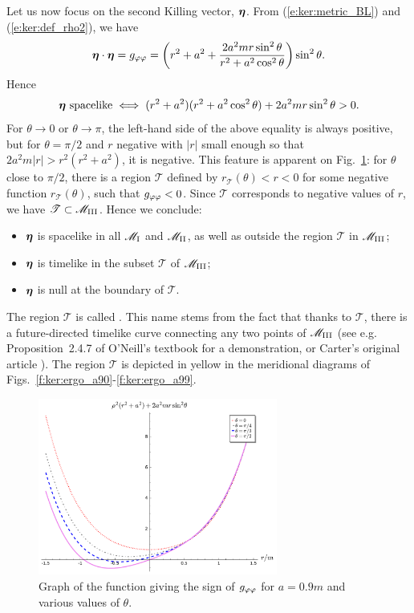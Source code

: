 Let us now focus on the second Killing vector, $\bm{\eta}$.
From (\ref{e:ker:metric_BL}) and (\ref{e:ker:def_rho2}), we have
\[
    \bm{\eta}\cdot\bm{\eta} = g_{\varphi\varphi} = \left( r^2 + a^2 + \frac{2 a^2 m r \sin^2\theta}{r^2 + a^2\cos^2\theta} \right) \sin^2\theta .
\]
Hence
\[
    \bm{\eta}\ \mbox{spacelike} \iff
        (r^2 + a^2)(r^2 + a^2\cos^2\theta) + 2 a^2 m r \sin^2\theta > 0 .
\]
For $\theta\rightarrow 0$ or $\theta\rightarrow\pi$, the left-hand side of the above equality
is always positive, but for $\theta=\pi/2$ and $r$ negative with $|r|$
small enough so that $2 a^2 m |r| > r^2(r^2 + a^2)$, it is negative. This feature
is apparent on Fig.~\ref{f:ker:sign_gpp}: for $\theta$ close to $\pi/2$,
there is a region $\mathscr{T}$ defined by $r_{\mathscr{T}}(\theta) < r < 0$ for some
negative function $r_{\mathscr{T}}(\theta)$, such that $g_{\varphi\varphi}<0$.
Since $\mathscr{T}$ corresponds to negative values of $r$, we have
$\mathscr{T}\subset \mathscr{M}_{\rm III}$.
Hence we conclude:
\begin{itemize}
\item $\bm{\eta}$ is spacelike in all $\mathscr{M}_{\rm I}$ and $\mathscr{M}_{\rm II}$, as well
as outside the region $\mathscr{T}$ in $\mathscr{M}_{\rm III}$;
\item $\bm{\eta}$ is timelike in the subset $\mathscr{T}$ of $\mathscr{M}_{\rm III}$;
\item $\bm{\eta}$ is null at the boundary of $\mathscr{T}$.
\end{itemize}
The region $\mathscr{T}$ is called
.
This name stems from the fact that thanks to $\mathscr{T}$, there is
a future-directed timelike curve connecting any two points of $\mathscr{M}_{\rm III}$
(see e.g. Proposition~2.4.7 of O'Neill's textbook \cite{ONeil95} for a
demonstration, or Carter's original article \cite{Carte68}).
The region $\mathscr{T}$ is depicted in yellow in the meridional
diagrams of
Figs.~\ref{f:ker:ergo_a90}-\ref{f:ker:ergo_a99}.
\begin{figure}
\centerline{\includegraphics[width=0.7\textwidth]{ker_sign_gpp.pdf}}
\caption[]{\label{f:ker:sign_gpp} \footnotesize
Graph of the function giving the sign of $g_{\varphi\varphi}$ for $a=0.9m$
and various values of $\theta$.}
\end{figure}


